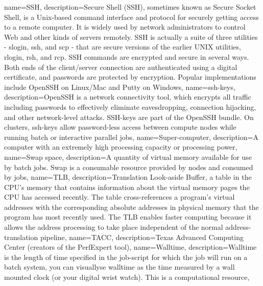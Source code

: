 {
  name={SSH},
  description={Secure Shell (SSH), sometimes known as Secure Socket Shell, is a Unix-based command interface and protocol for securely getting access to a remote computer. It is widely used by network administrators to control Web and other kinds of servers remotely. SSH is actually a suite of three utilities - slogin, ssh, and scp - that are secure versions of the earlier UNIX utilities, rlogin, rsh, and rcp. SSH commands are encrypted and secure in several ways. Both ends of the client/server connection are authenticated using a digital certificate, and passwords are protected by encryption. Popular implementations include OpenSSH on Linux/Mac and Putty on Windows},
}
{
  name={ssh-keys},
  description={OpenSSH is a network connectivity tool, which encrypts all traffic including passwords to effectively eliminate eavesdropping, connection hijacking, and other network-level attacks. SSH-keys are part of the OpenSSH bundle. On \hpc clusters, ssh-keys allow password-less access between compute nodes while running batch or interactive parallel jobs},
}
{
  name={Super-computer},
  description={A computer with an extremely high processing capacity or processing power},
}
{
  name={Swap space},
  description={A quantity of virtual memory available for use by batch jobs. Swap is a consumable resource provided by nodes and consumed by jobs},
}
{
  name={TLB},
  description={Translation Look-aside Buffer, a table in the CPU's memory that contains information about the virtual memory pages the CPU has accessed recently. The table cross-references a program's virtual addresses with the corresponding absolute addresses in physical memory that the program has most recently used. The TLB enables faster computing because it allows the address processing to take place independent of the normal address-translation pipeline},
}
{
  name={TACC},
  description={Texas Advanced Computing Center (creators of the PerfExpert tool)},
}
{
  name={Walltime},
  description={Walltime is the length of time specified in the job-script for which the job will run on a batch system, you can visuallyse walltime as the time measured by a wall mounted clock (or your digital wrist watch). This is a computational resource},
}
